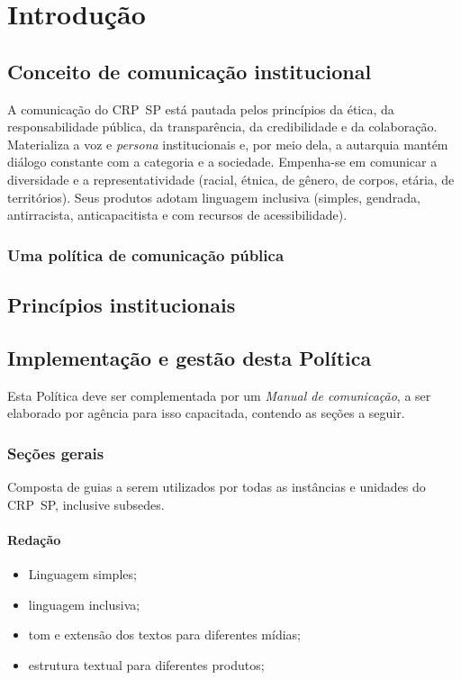 \chapter{Introdução}

\section{Conceito de comunicação institucional}

A comunicação do CRP~SP está pautada pelos princípios da ética, da responsabilidade pública, da transparência, da credibilidade e da colaboração. Materializa a voz e \emph{persona} institucionais e, por meio dela, a autarquia mantém diálogo constante com a categoria e a sociedade. Empenha-se em comunicar a diversidade e a representatividade (racial, étnica, de gênero, de corpos, etária, de territórios). Seus produtos adotam linguagem inclusiva (simples, gendrada, antirracista, anticapacitista e com recursos de acessibilidade).

\subsection{Uma política de comunicação pública}

\section{Princípios institucionais}

\section{Implementação e gestão desta Política}

Esta Política deve ser complementada por um \emph{Manual de comunicação}, a ser elaborado por agência para isso capacitada, contendo as seções a seguir.

\subsection{Seções gerais}

Composta de guias a serem utilizados por todas as instâncias e unidades do CRP~SP, inclusive subsedes.

\subsubsection{Redação}

\begin{itemize}
	\item
	Linguagem simples;
	\item
	linguagem inclusiva;
	\item
	tom e extensão dos textos para diferentes mídias;
	\item
	estrutura textual para diferentes produtos;
\end{itemize}

